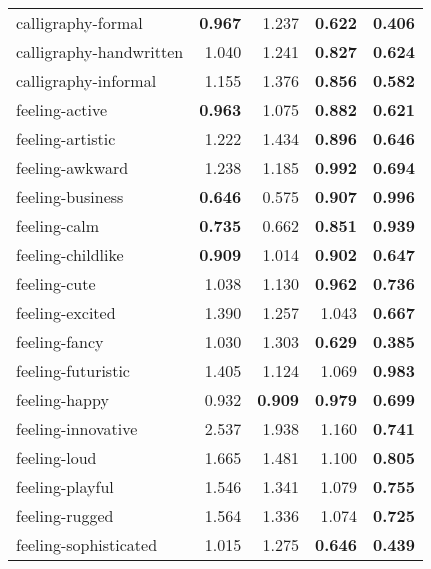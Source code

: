 \begin{longtable}{|l|r|r|r|r|}
calligraphy-formal        & \textbf{0.967} & 1.237          & \textbf{0.622} & \textbf{0.406} \\
calligraphy-handwritten   & 1.040          & 1.241          & \textbf{0.827} & \textbf{0.624} \\
calligraphy-informal      & 1.155          & 1.376          & \textbf{0.856} & \textbf{0.582} \\
feeling-active            & \textbf{0.963} & 1.075          & \textbf{0.882} & \textbf{0.621} \\
feeling-artistic          & 1.222          & 1.434          & \textbf{0.896} & \textbf{0.646} \\
feeling-awkward           & 1.238          & 1.185          & \textbf{0.992} & \textbf{0.694} \\
feeling-business          & \textbf{0.646} & 0.575          & \textbf{0.907} & \textbf{0.996} \\
feeling-calm              & \textbf{0.735} & 0.662          & \textbf{0.851} & \textbf{0.939} \\
feeling-childlike         & \textbf{0.909} & 1.014          & \textbf{0.902} & \textbf{0.647} \\
feeling-cute              & 1.038          & 1.130          & \textbf{0.962} & \textbf{0.736} \\
feeling-excited           & 1.390          & 1.257          & 1.043          & \textbf{0.667} \\
feeling-fancy             & 1.030          & 1.303          & \textbf{0.629} & \textbf{0.385} \\
feeling-futuristic        & 1.405          & 1.124          & 1.069          & \textbf{0.983} \\
feeling-happy             & 0.932          & \textbf{0.909} & \textbf{0.979} & \textbf{0.699} \\
feeling-innovative        & 2.537          & 1.938          & 1.160          & \textbf{0.741} \\
feeling-loud              & 1.665          & 1.481          & 1.100          & \textbf{0.805} \\
feeling-playful           & 1.546          & 1.341          & 1.079          & \textbf{0.755} \\
feeling-rugged            & 1.564          & 1.336          & 1.074          & \textbf{0.725} \\
feeling-sophisticated     & 1.015          & 1.275          & \textbf{0.646} & \textbf{0.439} \\

\end{longtable}
